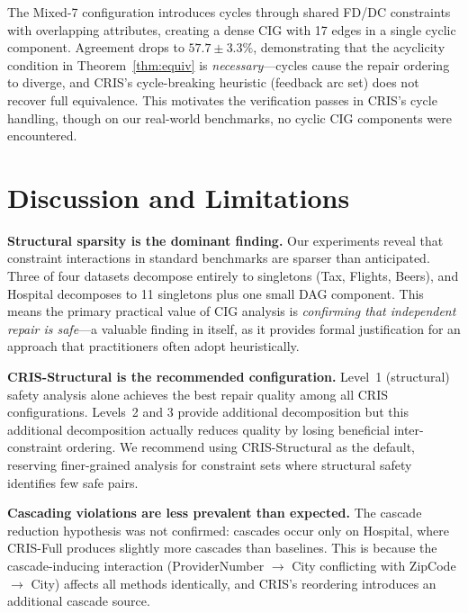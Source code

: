 \documentclass{article}
\newcommand{\cris}{\textsc{CRIS}\xspace}
\begin{document}
The Mixed-7 configuration introduces cycles through shared FD/DC constraints with overlapping attributes, creating a dense CIG with 17 edges in a single cyclic component. Agreement drops to $57.7 \pm 3.3\%$, demonstrating that the acyclicity condition in Theorem~\ref{thm:equiv} is \emph{necessary}---cycles cause the repair ordering to diverge, and \cris's cycle-breaking heuristic (feedback arc set) does not recover full equivalence. This motivates the verification passes in \cris's cycle handling, though on our real-world benchmarks, no cyclic CIG components were encountered.


\section{Discussion and Limitations}
\label{sec:discussion}

\textbf{Structural sparsity is the dominant finding.} Our experiments reveal that constraint interactions in standard benchmarks are sparser than anticipated. Three of four datasets decompose entirely to singletons (Tax, Flights, Beers), and Hospital decomposes to 11 singletons plus one small DAG component. This means the primary practical value of CIG analysis is \emph{confirming that independent repair is safe}---a valuable finding in itself, as it provides formal justification for an approach that practitioners often adopt heuristically.

\textbf{\cris-Structural is the recommended configuration.} Level~1 (structural) safety analysis alone achieves the best repair quality among all \cris configurations. Levels~2 and 3 provide additional decomposition but this additional decomposition actually reduces quality by losing beneficial inter-constraint ordering. We recommend using \cris-Structural as the default, reserving finer-grained analysis for constraint sets where structural safety identifies few safe pairs.

\textbf{Cascading violations are less prevalent than expected.} The cascade reduction hypothesis was not confirmed: cascades occur only on Hospital, where \cris-Full produces slightly more cascades than baselines. This is because the cascade-inducing interaction (ProviderNumber $\to$ City conflicting with ZipCode $\to$ City) affects all methods identically, and \cris's reordering introduces an additional cascade source.
\end{document}
